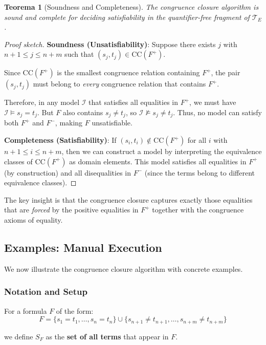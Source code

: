 \documentclass[11pt,a4paper]{article}
\theoremstyle{definition}
\theoremstyle{plain}
\newtheorem{theorem}{Teorema}[section]
\theoremstyle{remark}
\begin{document}
\begin{theorem}[Soundness and Completeness]
The congruence closure algorithm is sound and complete for deciding satisfiability in the quantifier-free fragment of $\mathcal{T}_E$.
\end{theorem}

\begin{proof}[Proof sketch]
\textbf{Soundness (Unsatisfiability)}: Suppose there exists $j$ with $n+1 \leq j \leq n+m$ such that $(s_j, t_j) \in \text{CC}(F^+)$. 

Since $\text{CC}(F^+)$ is the smallest congruence relation containing $F^+$, the pair $(s_j, t_j)$ must belong to \emph{every} congruence relation that contains $F^+$. 

Therefore, in any model $\mathcal{I}$ that satisfies all equalities in $F^+$, we must have $\mathcal{I} \models s_j = t_j$. But $F$ also contains $s_j \neq t_j$, so $\mathcal{I} \not\models s_j \neq t_j$. Thus, no model can satisfy both $F^+$ and $F^-$, making $F$ unsatisfiable.

\textbf{Completeness (Satisfiability)}: If $(s_i, t_i) \notin \text{CC}(F^+)$ for all $i$ with $n+1 \leq i \leq n+m$, then we can construct a model by interpreting the equivalence classes of $\text{CC}(F^+)$ as domain elements. This model satisfies all equalities in $F^+$ (by construction) and all disequalities in $F^-$ (since the terms belong to different equivalence classes).
\end{proof}

The key insight is that the congruence closure captures exactly those equalities that are \emph{forced} by the positive equalities in $F^+$ together with the congruence axioms of equality.

\subsection{Examples: Manual Execution}

We now illustrate the congruence closure algorithm with concrete examples.

\subsubsection{Notation and Setup}

For a formula $F$ of the form:
\[
F = \{s_1 = t_1, \dots, s_n = t_n\} \cup \{s_{n+1} \neq t_{n+1}, \dots, s_{n+m} \neq t_{n+m}\}
\]

we define $S_F$ as the \textbf{set of all terms} that appear in $F$.
\end{document}
